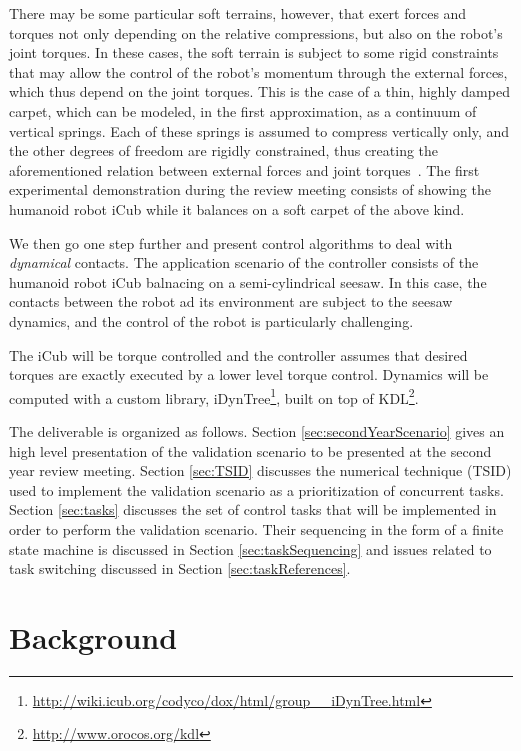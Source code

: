 \documentclass[12pt,a4paper,twoside]{article}
\begin{document}
There may be some particular soft terrains, however, that exert forces and torques not only depending on the relative compressions, but also on the robot's joint torques. In these cases, the soft terrain is subject to some rigid constraints that may allow the control of the robot's momentum through the external forces, which thus depend on the joint torques. This is the case of a thin, highly damped carpet, which can be modeled, in the first approximation, as a continuum of vertical springs. Each of these springs is assumed to compress vertically only, and the other degrees of freedom are rigidly constrained, thus creating the aforementioned relation between external forces and joint torques~\cite{deliverable32}. The first experimental demonstration during the review meeting consists of showing the humanoid robot iCub while it balances on a soft carpet of the above kind.


We then go one step further and  present control algorithms to deal with \emph{dynamical} contacts. The application scenario of the controller consists of the humanoid robot iCub balnacing on a semi-cylindrical seesaw. In this case, the contacts between the robot ad its environment are subject to the seesaw dynamics, and the control of the robot is particularly challenging. 

The iCub will be torque controlled and the controller assumes that desired torques are exactly executed by a lower level torque control. Dynamics will be computed with a custom library, iDynTree\footnote{\url{http://wiki.icub.org/codyco/dox/html/group__iDynTree.html}}, built on top of KDL\footnote{\url{http://www.orocos.org/kdl}}. 

The deliverable is organized as follows. Section \ref{sec:secondYearScenario} gives an high level presentation of the validation scenario to be presented at the second year review meeting. Section \ref{sec:TSID} discusses the numerical technique (TSID) used to implement the validation scenario as a prioritization of concurrent tasks. Section \ref{sec:tasks} discusses the set of control tasks that will be implemented in order to perform the validation scenario.  Their sequencing in the form of a finite state machine is discussed in Section \ref{sec:taskSequencing} and issues related to task switching discussed in Section \ref{sec:taskReferences}.

\section{Background} 
\label{sec:background}
\end{document}
